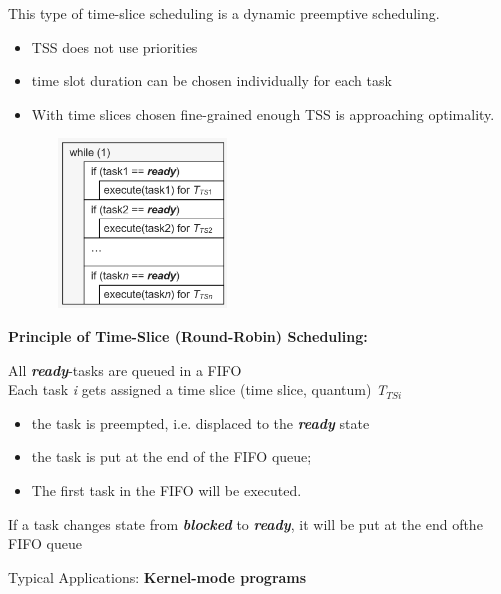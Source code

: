 This type of time-slice scheduling is a dynamic preemptive scheduling. 

\begin{itemize}
	\item TSS does not use priorities
	\item time slot duration can be chosen individually for each task
	\item With time slices chosen fine-grained enough TSS is approaching optimality.
\end{itemize}

	\begin{figure}[h]
    \centering
    \includegraphics[width=5cm, height=4.5cm]{Images/image90.png}
    \label{fig:Fig }
    \end{figure}
    
\textbf{Principle of Time-Slice (Round-Robin) Scheduling: }

\begin{tcolorbox}[colback=blue!5!white,colframe=blue!75!black]
  All \textbf{\textit{ready}}-tasks are queued in a FIFO \\
  
  Each task \textit{i} gets assigned a time slice (time slice, quantum) \textit{T${}_{TSi}$}\\
  
  \begin{itemize}
		\item  the task is preempted, i.e. displaced to the \textbf{\textit{ready}} state
		\item  the task is put at the end of the FIFO queue;
		\item  The first task in the FIFO will be executed.
	\end{itemize}
  
  If a task changes state from \textbf{\textit{blocked}} to \textbf{\textit{ready}}, it will be put at the end ofthe FIFO queue
\end{tcolorbox}

Typical Applications: \textbf{Kernel-mode programs} \\ 

